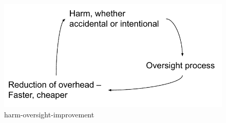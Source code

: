 

\begin{figure}
    \centering
    \includegraphics{images/process_loop_harm-oversight-improvement}
    \caption{harm-oversight-improvement}
    \label{fig:harm-oversight-improvement}
\end{figure}


